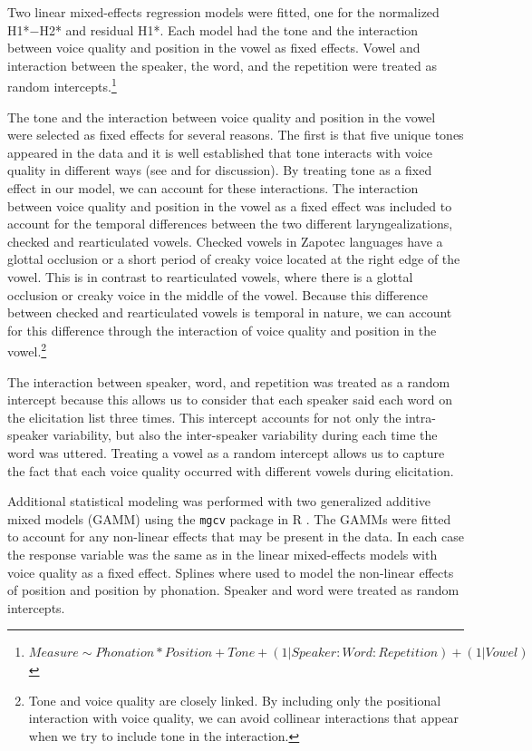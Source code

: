 Two linear mixed-effects regression models were fitted, one for the normalized H1*$-$H2* and residual H1*. Each model had the tone and the interaction between voice quality and position in the vowel as fixed effects. Vowel and interaction between the speaker, the word, and the repetition were treated as random intercepts.\footnote{ $Measure \sim  Phonation*Position + Tone + (1|Speaker:Word:Repetition) + (1|Vowel)$}

The tone and the interaction between voice quality and position in the vowel were selected as fixed effects for several reasons. The first is that five unique tones appeared in the data and it is well established that tone interacts with voice quality in different ways (see \cite{espositoCrosslinguisticPatternsPhonation2020} and \cite{garellekPhoneticsVoice2019} for discussion). By treating tone as a fixed effect in our model, we can account for these interactions. The interaction between voice quality and position in the vowel as a fixed effect was included to account for the temporal differences between the two different laryngealizations, checked and rearticulated vowels. Checked vowels in Zapotec languages have a glottal occlusion or a short period of creaky voice located at the right edge of the vowel. This is in contrast to rearticulated vowels, where there is a glottal occlusion or creaky voice in the middle of the vowel. Because this difference between checked and rearticulated vowels is temporal in nature, we can account for this difference through the interaction of voice quality and position in the vowel.\footnote{Tone and voice quality are closely linked. By including only the positional interaction with voice quality, we can avoid collinear interactions that appear when we try to include tone in the interaction.}

The interaction between speaker, word, and repetition was treated as a random intercept because this allows us to consider that each speaker said each word on the elicitation list three times. This intercept accounts for not only the intra-speaker variability, but also the inter-speaker variability during each time the word was uttered. Treating a vowel as a random intercept allows us to capture the fact that each voice quality occurred with different vowels during elicitation.

Additional statistical modeling was performed with two generalized additive mixed models (GAMM) using the \texttt{mgcv} package in R \citep{woodGeneralizedAdditiveModels2017}. The GAMMs were fitted to account for any non-linear effects that may be present in the data. In each case the response variable was the same as in the linear mixed-effects models with voice quality as a fixed effect. Splines where used to model the non-linear effects of position and position by phonation. Speaker and word were treated as random intercepts.

